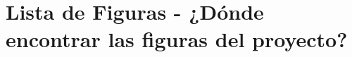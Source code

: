 \clearpage
\section{Lista de Figuras - ¿Dónde encontrar las figuras del proyecto?}\label{sec:spmp-4}
\makeatletter{}\makeatother
